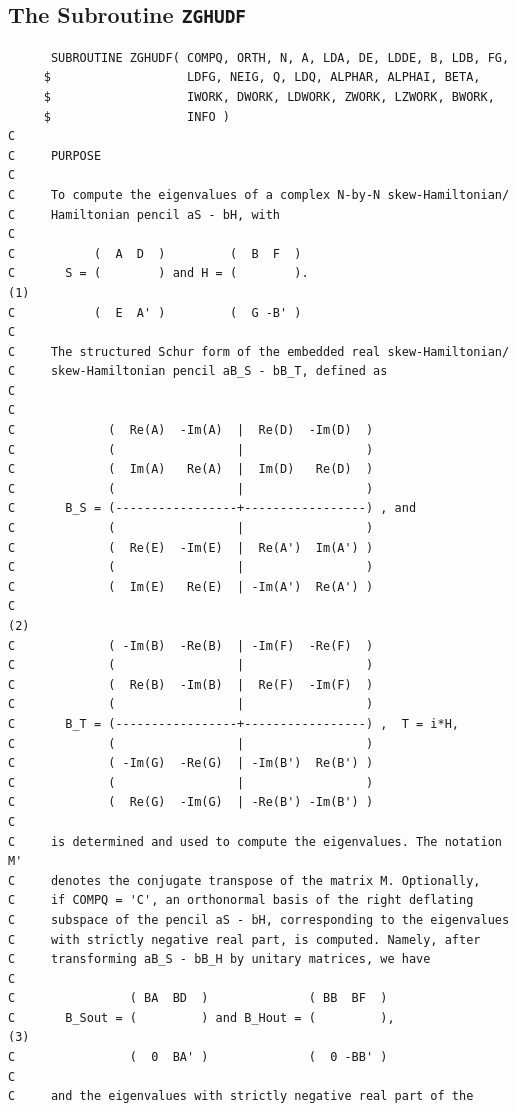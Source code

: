 \documentclass[a4paper,10pt]{article}
\begin{document}
\subsection{The Subroutine \texttt{ZGHUDF}}
%
\begin{verbatim}
      SUBROUTINE ZGHUDF( COMPQ, ORTH, N, A, LDA, DE, LDDE, B, LDB, FG,
     $                   LDFG, NEIG, Q, LDQ, ALPHAR, ALPHAI, BETA,
     $                   IWORK, DWORK, LDWORK, ZWORK, LZWORK, BWORK,
     $                   INFO )
C
C     PURPOSE
C
C     To compute the eigenvalues of a complex N-by-N skew-Hamiltonian/
C     Hamiltonian pencil aS - bH, with
C
C           (  A  D  )         (  B  F  )
C       S = (        ) and H = (        ).                           (1)
C           (  E  A' )         (  G -B' )
C
C     The structured Schur form of the embedded real skew-Hamiltonian/
C     skew-Hamiltonian pencil aB_S - bB_T, defined as
C
C
C             (  Re(A)  -Im(A)  |  Re(D)  -Im(D)  )
C             (                 |                 )
C             (  Im(A)   Re(A)  |  Im(D)   Re(D)  )
C             (                 |                 )
C       B_S = (-----------------+-----------------) , and
C             (                 |                 )
C             (  Re(E)  -Im(E)  |  Re(A')  Im(A') )
C             (                 |                 )
C             (  Im(E)   Re(E)  | -Im(A')  Re(A') )
C                                                                    (2)
C             ( -Im(B)  -Re(B)  | -Im(F)  -Re(F)  )
C             (                 |                 )
C             (  Re(B)  -Im(B)  |  Re(F)  -Im(F)  )
C             (                 |                 )
C       B_T = (-----------------+-----------------) ,  T = i*H,
C             (                 |                 )
C             ( -Im(G)  -Re(G)  | -Im(B')  Re(B') )
C             (                 |                 )
C             (  Re(G)  -Im(G)  | -Re(B') -Im(B') )
C
C     is determined and used to compute the eigenvalues. The notation M'
C     denotes the conjugate transpose of the matrix M. Optionally,
C     if COMPQ = 'C', an orthonormal basis of the right deflating
C     subspace of the pencil aS - bH, corresponding to the eigenvalues
C     with strictly negative real part, is computed. Namely, after
C     transforming aB_S - bB_H by unitary matrices, we have
C
C                ( BA  BD  )              ( BB  BF  )
C       B_Sout = (         ) and B_Hout = (         ),               (3)
C                (  0  BA' )              (  0 -BB' )
C
C     and the eigenvalues with strictly negative real part of the

\end{verbatim}
\end{document}
